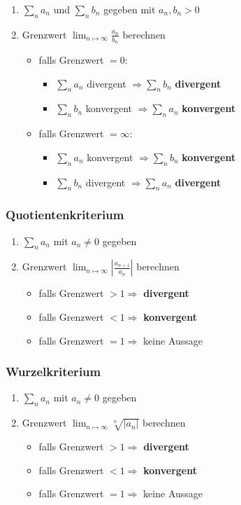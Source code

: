 \documentclass[11pt]{article}
\begin{document}
\begin{enumerate}
	\item $\sum_n a_n$ und $\sum_n b_n$ gegeben mit $a_n,b_n > 0$
	\item Grenzwert $\lim_{n\mapsto\infty} \frac{a_n}{b_n}$ berechnen
	\begin{itemize}
		\item falls Grenzwert $= 0$:
		\begin{itemize}
			\item $\sum_n a_n$ divergent $\Rightarrow \sum_n b_n$ \textbf{divergent}
			\item $\sum_n b_n$ konvergent $\Rightarrow \sum_n a_n$ \textbf{konvergent}
		\end{itemize} 
		\item falls Grenzwert $= \infty$:
		\begin{itemize}
			\item $\sum_n a_n$ konvergent $\Rightarrow \sum_n b_n$ \textbf{konvergent}
			\item $\sum_n b_n$ divergent $\Rightarrow \sum_n a_n$ \textbf{divergent}
		\end{itemize} 
	\end{itemize}
\end{enumerate}

\subsubsection*{Quotientenkriterium}

\begin{enumerate}
	\item $\sum_n a_n$ mit $a_n \neq 0$ gegeben
	\item Grenzwert $\lim_{n\mapsto\infty}|\frac{a_{n+1}}{a_n}|$ berechnen
	\begin{itemize}
		\item falls Grenzwert $> 1 \Rightarrow$ \textbf{divergent}
		\item falls Grenzwert $< 1 \Rightarrow$ \textbf{konvergent}
		\item falls Grenzwert $= 1 \Rightarrow$ keine Aussage
	\end{itemize}
\end{enumerate}

\subsubsection*{Wurzelkriterium}

\begin{enumerate}
	\item $\sum_n a_n$ mit $a_n \neq 0$ gegeben
	\item Grenzwert $\lim_{n\mapsto\infty}\sqrt[n]{|a_n|}$ berechnen
	\begin{itemize}
		\item falls Grenzwert $> 1 \Rightarrow$ \textbf{divergent}
		\item falls Grenzwert $< 1 \Rightarrow$ \textbf{konvergent}
		\item falls Grenzwert $= 1 \Rightarrow$ keine Aussage
	\end{itemize}
\end{enumerate}
\end{document}
